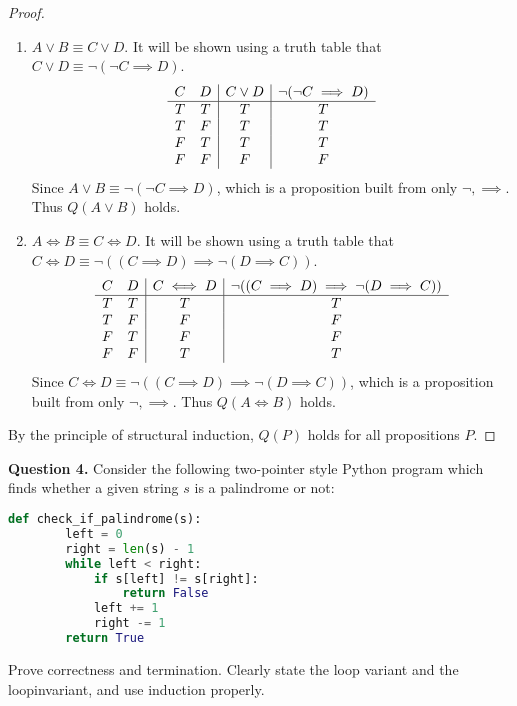 \documentclass[11pt]{article}
\begin{document}
\begin{proof}
\begin{enumerate}
            \item \(A \lor B \equiv C \lor D\). It will be shown using a truth table that \(C \lor D \equiv \neg(\neg C\implies D)\).
            \begin{displaymath}
                \begin{array}{c c | c | c}
                    C & D & C \lor D & \neg(\neg C\implies D)\\
                    \hline
                    T & T & T & T\\
                    T & F & T & T\\
                    F & T & T & T\\
                    F & F & F & F\\
                \end{array}
            \end{displaymath}
            Since \(A \lor B \equiv \neg(\neg C\implies D)\), which is a proposition built from only \(\neg, \implies\). Thus \(Q(A \lor B)\) holds.

            \item \(A \iff B \equiv C \iff D\). It will be shown using a truth table that \(C \iff D \equiv \neg((C \implies D) \implies \neg(D \implies C))\).
            \begin{displaymath}
                \begin{array}{c c | c | c}
                    C & D & C \iff D & \neg((C \implies D) \implies \neg(D \implies C))\\
                    \hline
                    T & T & T & T\\
                    T & F & F & F\\
                    F & T & F & F\\
                    F & F & T & T\\
                \end{array}
            \end{displaymath}
            Since \(C \iff D \equiv \neg((C \implies D) \implies \neg(D \implies C))\), which is a proposition built from only \(\neg, \implies\). Thus \(Q(A \iff B)\) holds.
        \end{enumerate}
        By the principle of structural induction, \(Q(P)\) holds for all propositions \(P\).
        
    \end{proof}
    \pagebreak
    \noindent\textbf{Question 4.} Consider the following two-pointer style Python program which finds whether a given string $s$ is a palindrome or not:
    \begin{lstlisting}[language=Python]
    def check_if_palindrome(s):
        left = 0
        right = len(s) - 1
        while left < right:
            if s[left] != s[right]:
                return False
            left += 1
            right -= 1
        return True
    \end{lstlisting}
    Prove correctness and termination. Clearly state the loop variant and the loopinvariant, and use induction properly.
    
\end{document}

